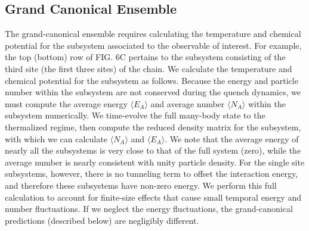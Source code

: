 \subsection*{Grand Canonical Ensemble}

The grand-canonical ensemble requires calculating the temperature and chemical potential for the subsystem associated to the observable of interest. For example, the top (bottom) row of FIG. 6C pertains to the subsystem consisting of the third site (the first three sites) of the chain. We calculate the temperature and chemical potential for the subsystem as follows. Because the energy and particle number within the subsystem are not conserved during the quench dynamics, we must compute the average energy $\langle E_A \rangle$ and average number $\langle N_A \rangle$ within the subsystem numerically. We time-evolve the full many-body state to the thermalized regime, then compute the reduced density matrix for the subsystem, with which we can calculate $\langle N_A \rangle$  and $\langle E_A \rangle$. %
We note that the average energy of nearly all the subsystems is very close to that of the full system (zero), while the average number is nearly consistent with unity particle density. For the single site subsystems, however, there is no tunneling term to offset the interaction energy, and therefore these subsystems have non-zero energy. We perform this full calculation to account for finite-size effects that cause small temporal energy and number fluctuations. If we neglect the energy fluctuations, the grand-canonical predictions (described below) are negligibly different. 

